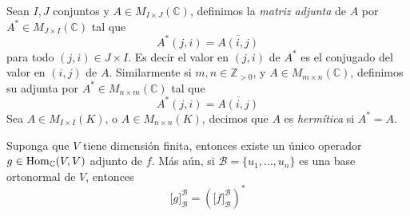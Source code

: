 \begin{defn}
Sean $I,J$ conjuntos y $A\in M_{I\times J}(\mathbb{C})$, definimos la \emph{matriz adjunta} de $A$ por $A^*\in M_{J\times I}(\mathbb{C})$ tal que
\[
A^*(j,i)=\overline{A(i,j)}
\]
para todo $(j,i)\in J\times I$. Es decir el valor en $(j,i)$ de $A^*$ es el conjugado del valor en $(i,j)$ de $A$. Similarmente si $m,n\in\mathbb{Z}_{>0}$, y $A\in M_{m\times n}(\mathbb{C})$, definimos su adjunta por $A^*\in M_{n\times m}(\mathbb{C})$ tal que
\[
A^*(j,i)=\overline{A(i,j)}
\]
Sea $A\in M_{I\times I}(K)$, o $A\in M_{n\times n}(K)$, decimos que $A$ es \emph{herm\'itica} si $A^*=A$.
\end{defn}

\begin{prop}\label{adjtrasher}
Suponga que $V$ tiene dimensi\'on finita, entonces existe un \'unico operador $g\in\operatorname{Hom}_{\mathbb{C}}(V,V)$ adjunto de $f$. M\'as a\'un, si $\mathcal{B}=\{u_1,\ldots,u_n\}$ es una base ortonormal de $V$, entonces
\[
\Big[g\Big]^\mathcal{B}_\mathcal{B}=\left(\Big[f\Big]^\mathcal{B}_\mathcal{B}\right)^*
\]
\end{prop}

